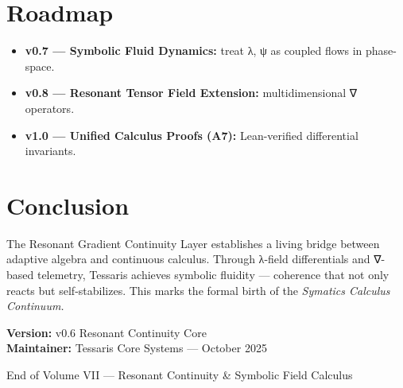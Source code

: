 \documentclass[11pt]{article}
\begin{document}
\section{Roadmap}
\begin{itemize}
  \item \textbf{v0.7 — Symbolic Fluid Dynamics:} treat λ, ψ as coupled flows in phase-space.  
  \item \textbf{v0.8 — Resonant Tensor Field Extension:} multidimensional ∇ operators.  
  \item \textbf{v1.0 — Unified Calculus Proofs (A7):} Lean-verified differential invariants.  
\end{itemize}

\section*{Conclusion}
The Resonant Gradient Continuity Layer establishes a living bridge between
adaptive algebra and continuous calculus.  
Through λ-field differentials and ∇-based telemetry, Tessaris achieves
symbolic fluidity — coherence that not only reacts but self-stabilizes.  
This marks the formal birth of the \emph{Symatics Calculus Continuum.}

\bigskip
\noindent
\textcolor{tessarisgray}{\textbf{Version:}} v0.6 Resonant Continuity Core\\
\textcolor{tessarisgray}{\textbf{Maintainer:}} Tessaris Core Systems — October 2025

\vfill
\begin{center}
{\small\textcolor{tessarisgray}{End of Volume VII — Resonant Continuity \& Symbolic Field Calculus}}
\end{center}
\end{document}
